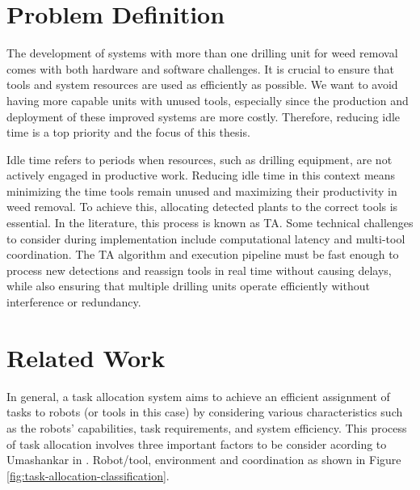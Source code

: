 \section{Problem Definition}

The development of systems with more than one drilling unit for weed removal comes with both hardware and software challenges. It is crucial to ensure that tools and system resources are used as efficiently as possible. We want to avoid having more capable units with unused tools, especially since the production and deployment of these improved systems are more costly. Therefore, reducing idle time is a top priority and the focus of this thesis.


Idle time refers to periods when resources, such as drilling equipment, are not actively engaged in productive work. Reducing idle time in this context means minimizing the time tools remain unused and maximizing their productivity in weed removal. To achieve this, allocating detected plants to the correct tools is essential. In the literature, this process is known as \ac{TA}. Some technical challenges to consider during implementation include computational latency and multi-tool coordination. The \ac{TA} algorithm and execution pipeline must be fast enough to process new detections and reassign tools in real time without causing delays, while also ensuring that multiple drilling units operate efficiently without interference or redundancy.

\section{Related Work}

In general, a task allocation system aims to achieve an efficient assignment of tasks to robots (or tools in this case) by considering various characteristics such as the robots' capabilities, task requirements, and system efficiency. This process of task allocation involves three important factors to be consider acording to Umashankar in \cite{10.1145/3700591}. Robot/tool, environment and coordination as shown in Figure \ref{fig:task-allocation-classification}. 


